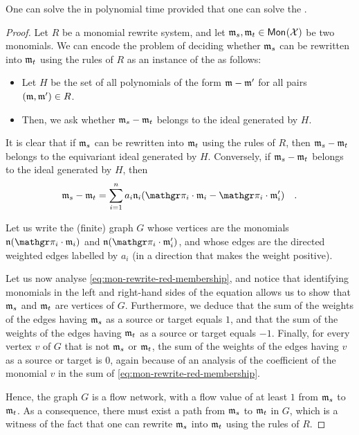 \begin{lemma}
  \label{lem:mon-rewrite-red-membership}
  One can solve the  in polynomial time
  provided that one can solve the .
\end{lemma}
\begin{proof}
  Let $R$ be a monomial rewrite system, and let $\monelt_s, \monelt_t \in
  \mon{\Indets}$ be two monomials. We can encode the problem of deciding whether
  $\monelt_s$ can be rewritten into $\monelt_t$ using the rules of $R$ as an
  instance of the  as follows:
  \begin{itemize}
    \item Let $H$ be the set of all polynomials of the form $\monelt - \monelt'$
      for all pairs
      $(\monelt, \monelt') \in R$.
    \item Then, we ask whether $\monelt_s - \monelt_t$ belongs to the ideal generated by $H$.
  \end{itemize}

  It is clear that if $\monelt_s$ can be rewritten into $\monelt_t$ using the
  rules of $R$, then $\monelt_s - \monelt_t$ belongs to the equivariant ideal generated by
  $H$. Conversely, if $\monelt_s - \monelt_t$ belongs to the ideal generated by
  $H$, then 
  \begin{equation}
    \label{eq:mon-rewrite-red-membership}
    \monelt_s - \monelt_t 
    = 
    \sum_{i=1}^n a_i \monelt[n]_i (\gelem_i \cdot \monelt_i - \gelem_i \cdot \monelt'_i)
    \quad .
  \end{equation}

  Let us write the (finite) graph $G$ whose vertices are the monomials
  $\monelt[n] (\gelem_i \cdot \monelt_i)$ and $\monelt[n] (\gelem_i \cdot
  \monelt'_i)$, and whose edges are the directed weighted edges labelled by
  $a_i$ (in a direction that makes the weight positive).

  Let us now analyse \cref{eq:mon-rewrite-red-membership}, and notice that
  identifying monomials in the left and right-hand sides of the equation allows
  us to show that $\monelt_s$ and $\monelt_t$ are vertices of $G$. Furthermore,
  we deduce that the sum of the weights of the edges having $\monelt_s$ as a
  source or target equals $1$, and that the sum of the weights of the edges
  having $\monelt_t$ as a source or target equals $-1$. Finally, for every
  vertex $v$ of $G$ that is not $\monelt_s$ or $\monelt_t$, the sum of the
  weights of the edges having $v$ as a source or target is $0$, again because
  of an analysis of the coefficient of the monomial $v$ in the sum of
  \cref{eq:mon-rewrite-red-membership}.

  Hence, the graph $G$ is a flow network, with a flow value of at least $1$
  from $\monelt_s$ to $\monelt_t$. As a consequence, there must exist a path
  from $\monelt_s$ to $\monelt_t$ in $G$, which is a witness
  of the fact that 
  one can rewrite $\monelt_s$ into $\monelt_t$ using the rules of $R$.
\end{proof}
